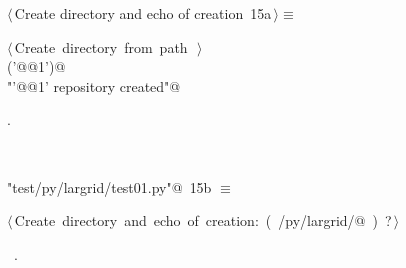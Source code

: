 \documentclass[11pt,oneside]{article}	%
\begin{document}
\begin{flushleft} \small
\begin{minipage}{\linewidth} \label{scrap23}
\protect{}$\langle\,$Create directory and echo of creation\nobreak\ {\footnotesize 15a}$\,\rangle\equiv$
\vspace{-1ex}
\begin{list}{}{} \item
\mbox{}\verb@@\hbox{$\langle\,$Create directory from path\nobreak\ {\footnotesize {}}$\,\rangle$}\verb@@\\
\mbox{}\verb@createDir('@@1\verb@')@\\
\mbox{}\verb@print "'@@1\verb@' repository created"@\\
\mbox{}\verb@@{\NWsep}
\end{list}
\vspace{-1ex}
\footnotesize\addtolength{\baselineskip}{-1ex}
\begin{list}{}{\setlength{\itemsep}{-\parsep}\setlength{\itemindent}{-\leftmargin}}
\item {\NWtxtMacroNoRef}.
\end{list}
\end{minipage}\\[4ex]
\end{flushleft}

\begin{flushleft} \small
\begin{minipage}{\linewidth} \label{scrap24}
\protect{}\verb@"test/py/largrid/test01.py"@\nobreak\ {\footnotesize 15b }$\equiv$
\vspace{-1ex}
\begin{list}{}{} \item
\mbox{}\verb@@\hbox{$\langle\,$Create directory and echo of creation:\nobreak\ ({\footnotesize {}\label{scrap25}
 }\mbox{}\verb@test/py/largrid/@ ) {\footnotesize ?}$\,\rangle$}\verb@@\\
\mbox{}\verb@@{\NWsep}
\end{list}
\vspace{-1ex}
\footnotesize\addtolength{\baselineskip}{-1ex}
\begin{list}{}{\setlength{\itemsep}{-\parsep}\setlength{\itemindent}{-\leftmargin}}
\item \NWtxtFileDefBy\ .
\end{list}
\end{minipage}\\[4ex]
\end{flushleft}
\end{document}
